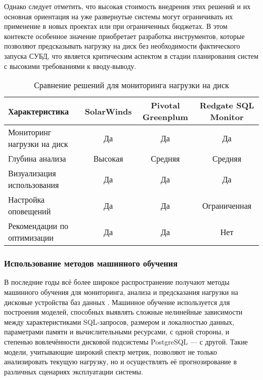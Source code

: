 Однако следует отметить, что высокая стоимость внедрения этих решений и их основная ориентация на уже развернутые системы могут ограничивать их применение в новых проектах или при ограниченных бюджетах. В этом контексте особенное значение приобретает разработка инструментов, которые позволяют предсказывать нагрузку на диск без необходимости фактического запуска СУБД, что является критическим аспектом в стадии планирования систем с высокими требованиями к вводу-выводу.

\begin{table}[H]
    \centering
    \small %
    \setlength{\tabcolsep}{4pt} %
    \renewcommand{\arraystretch}{1.2} %
    \begin{tabular}{|p{5cm}|c|c|c|}
        \hline
        \textbf{Характеристика} & \textbf{SolarWinds} & \textbf{Pivotal Greenplum} & \textbf{Redgate SQL Monitor} \\ 
        \hline
        Мониторинг нагрузки на диск & Да & Да & Да \\ 
        \hline
        Глубина анализа & Высокая & Средняя & Средняя \\ 
        \hline
        Визуализация использования & Да & Да & Да \\ 
        \hline
        Настройка оповещений & Да & Да & Ограниченная \\ 
        \hline
        Рекомендации по оптимизации & Да & Да & Нет \\ 
        \hline
    \end{tabular}
    \caption{Сравнение решений для мониторинга нагрузки на диск}
    \label{tab:disk_monitoring}
\end{table}
\subsubsection{Использование методов машинного обучения}

В последние годы всё более широкое распространение получают методы машинного обучения для мониторинга, анализа и предсказания нагрузки на дисковые устройства баз данных \cite{zaghloul2024correction, chen2019machine, sun2023predictive}. Машинное обучение используется для построения моделей, способных выявлять сложные нелинейные зависимости между характеристиками SQL-запросов, размером и локалностью данных, параметрами памяти и вычислительными ресурсами, с одной стороны, и степенью вовлечённости дисковой подсистемы PostgreSQL — с другой. Такие модели, учитывающие широкий спектр метрик, позволяют не только анализировать текущую нагрузку, но и осуществлять её прогнозирование в различных сценариях эксплуатации системы.

